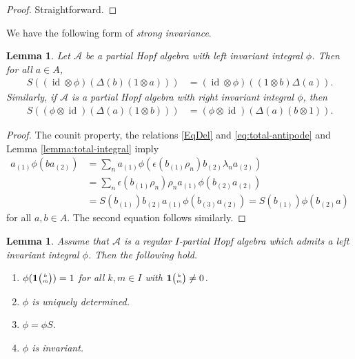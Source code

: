 \documentclass[11pt]{article}
\DeclareMathOperator{\id}{id}
\newcommand{\Grt}[3]{#1{\tiny {\begin{pmatrix} #2\\#3\end{pmatrix}}}}
\newcommand{\UnitC}[2]{\Grt{\mathbf{1}}{#1}{#2}}
\newtheorem{Lem}[Theorem]{Lemma}
\theoremstyle{definition}
\numberwithin{equation}{section}
\begin{document}
\begin{proof}
  Straightforward.
\end{proof}

We have the following form of \emph{strong invariance}.

\begin{Lem} \label{lemma:strong-invariance}
  Let $\mathscr{A}$ be a partial Hopf algebra with left invariant integral $\phi$. Then
  for all $a\in A$,
  \begin{align*}
    S\left(( \id\otimes
    \phi)(\Delta(b)(1 \otimes a))\right) &= (\id \otimes \phi)((1 \otimes b)\Delta(a)).
  \end{align*}
  Similarly, if $\mathscr{A}$ is a partial Hopf algebra with right invariant integral $\phi$, then 
   \begin{align*} S\left((\phi \otimes
    \id)(\Delta(a)(1\otimes b))\right) &= (\phi \otimes \id)(\Delta(a)(b \otimes 1)).\end{align*}
\end{Lem}
\begin{proof}
 The counit property, the relations \eqref{EqDel} and
 \eqref{eq:total-antipode} and Lemma \ref{lemma:total-integral} imply
  \begin{align*}
    a_{(1)}\phi(ba_{(2)}) &= \sum_{n}
    a_{(1)}\phi(\epsilon(b_{(1)}\rho_{n})b_{(2)}\lambda_{n}a_{(2)}) \\
&= \sum_{n} \epsilon(b_{(1)}\rho_{n})\rho_{n}a_{(1)}\phi(b_{(2)}a_{(2)})
\\
&= S(b_{(1)})b_{(2)}a_{(1)}\phi(b_{(3)}a_{(2)}) =
S(b_{(1)})\phi(b_{(2)}a)
  \end{align*}
for all $a,b \in A$. The second equation 
follows similarly.
\end{proof}

\begin{Lem} Assume that $\mathscr{A}$ is a regular  $I$-partial Hopf algebra which admits a left invariant integral $\phi$. Then the following hold.
\begin{enumerate}[label = {(\arabic*)}]
\item\label{LI1} $\phi(\UnitC{k}{m})=1$ for all $k,m\in I$ with $\UnitC{k}{m}\neq 0$.
\item\label{LI2} $\phi$ is uniquely determined.
\item\label{LI3} $\phi=\phi S$.
\item\label{LI4} $\phi$ is invariant.
\end{enumerate}
\end{Lem}
\end{document}
